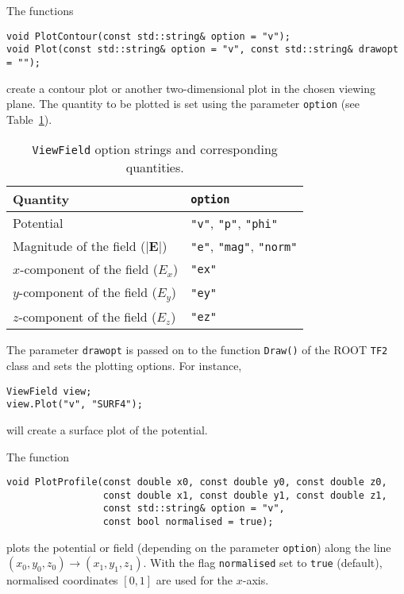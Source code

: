 The functions 
\begin{lstlisting}
void PlotContour(const std::string& option = "v");
void Plot(const std::string& option = "v", const std::string& drawopt = "");
\end{lstlisting}
create a contour plot or another two-dimensional plot in the chosen viewing plane.
The quantity to be plotted is set using the parameter \texttt{option} 
(see Table~\ref{Tab:ViewFieldOptionStrings}).
\begin{table}
  \centering
  \caption{\texttt{ViewField} option strings and corresponding quantities.}
  \label{Tab:ViewFieldOptionStrings}
  \begin{tabular}{l l} 
    \toprule
    Quantity & \texttt{option} \\
    \midrule
    Potential & \texttt{"v"}, \texttt{"p"}, \texttt{"phi"} \\
    Magnitude of the field ($\left|\mathbf{E}\right|$) & \texttt{"e"}, \texttt{"mag"}, \texttt{"norm"} \\
    $x$-component of the field ($E_{x}$) & \texttt{"ex"} \\ 
    $y$-component of the field ($E_{y}$) & \texttt{"ey"} \\ 
    $z$-component of the field ($E_{z}$) & \texttt{"ez"} \\ 
    \bottomrule
  \end{tabular}
\end{table}
The parameter \texttt{drawopt} is passed on to the function \texttt{Draw()} of the
ROOT \texttt{TF2} class and sets the plotting options. For instance,
\begin{lstlisting}
ViewField view;
view.Plot("v", "SURF4");
\end{lstlisting}
will create a surface plot of the potential.

The function 
\begin{lstlisting}
void PlotProfile(const double x0, const double y0, const double z0,
                 const double x1, const double y1, const double z1,
                 const std::string& option = "v",
                 const bool normalised = true);
\end{lstlisting}
plots the potential or field (depending on the parameter \texttt{option}) 
along the line  
\(\left(x_{0}, y_{0}, z_{0}\right) \rightarrow 
  \left(x_{1}, y_{1}, z_{1}\right)\).
With the flag \texttt{normalised} set to \texttt{true} (default), 
normalised coordinates $\left[0, 1\right]$ are used for the $x$-axis. 

